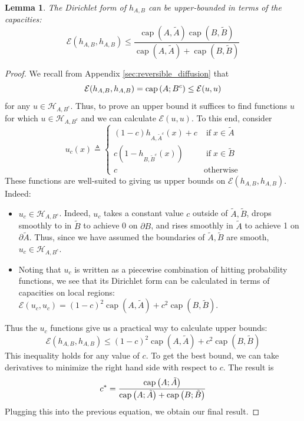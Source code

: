 \documentclass[english, aip, jcp, priprint, graphicx,floatfix]{revtex4-1}
\newcommand{\tmop}[1]{\ensuremath{\operatorname{#1}}}
\newtheorem{lemma}{Lemma}
\theoremstyle{plain}
\theoremstyle{definition}
\theoremstyle{plain}
\begin{document}
\begin{lemma}  The Dirichlet form of $h_{A,B}$ can be upper-bounded in terms of the capacities:
\[ \mathcal{E} (h_{A,B}, h_{A,B}) \leqslant \frac{\tmop{cap} (A, \tilde{A}) \tmop{cap} (B,
\tilde{B})}{\tmop{cap} (A, \tilde{A}) + \tmop{cap} (B, \tilde{B})} \]
\end{lemma}
\begin{proof}
We recall from Appendix \ref{sec:reversible_diffusion} that
%
\[
\mathcal{E} (h_{A,B}, h_{A,B}) = \mathrm{cap}\left(A;B^c\right) \leq \mathcal{E} (u,u)
\]
%
for any $u\in \mathcal{H}_{A, B^c}$.  Thus, to prove an upper bound it suffices to find functions $u$ for which $u\in \mathcal{H}_{A, B^c}$ and we can calculate $\mathcal{E}(u,u)$.  To this end, consider
%
\[
u_c (x) \triangleq \left\{ \begin{array}{ll}
(1 - c) h_{A, \widetilde{A}^c} (x) + c & \tmop{if} x \in \tilde{A}\\
c (1 - h_{B, \widetilde{B}^c} (x)) & \tmop{if} x \in \tilde{B}\\
c & \tmop{otherwise}
\end{array} \right. 
\]
%
These functions are well-suited to giving us upper bounds on $\mathcal{E} (h_{A,B}, h_{A,B})$.  Indeed:
\begin{itemize}
\item $u_c \in \mathcal{H}_{A, B^c}$.  Indeed, $u_c$ takes a constant value $c$ outside of $\tilde A,\tilde B$, drops smoothly to in $\tilde B$ to achieve 0 on $\partial B$, and rises smoothly in $\tilde A$ to achieve 1 on $\partial \tilde A$.  Thus, since we have assumed the boundaries of $\tilde A,\tilde B$ are smooth, $u_c \in \mathcal H_{A,B^c}$.  
\item Noting that $u_c$ is written as a piecewise combination of hitting probability functions, we see that its Dirichlet form can be calculated in terms of capacities on local regions: $\mathcal{E}(u_c,u_c) = (1 - c)^2 \tmop{cap} (A, \tilde{A}) + c^2 \tmop{cap} (B, \tilde{B})$.
\end{itemize}
Thus the $u_c$ functions give us a practical way to calculate upper bounds: 
\[
\mathcal{E} (h_{A,B}, h_{A,B})\leq (1 - c)^2 \tmop{cap} (A, \tilde{A}) + c^2 \tmop{cap} (B, \tilde{B})
\]
This inequality holds for any value of $c$.  To get the best bound, we can take derivatives to minimize the right hand side with respect to $c$.  The result is 
\[
c^* = \frac{\mathrm{cap}\left(A;\tilde A\right)}{\mathrm{cap}\left(A;\tilde A\right)+\mathrm{cap}\left(B;\tilde B\right)}
\]
Plugging this into the previous equation, we obtain our final result.
\end{proof}
\end{document}
